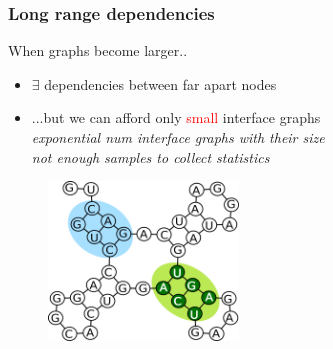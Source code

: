 \documentclass{beamer}
\newcommand{\red}[1]{\textcolor{red}{#1}}
\begin{document}
\begin{frame}
    \frametitle{Long range dependencies}
    When graphs become larger..
    \begin{itemize}
        \item $\exists$ dependencies between far apart nodes 
        \item ...but we can afford only \red{small} interface graphs  \\
        {\em exponential num interface graphs with their size} \\
        {\em not enough samples to collect statistics}
    \end{itemize}
   \begin{figure}[h!]
        \centering
        \includegraphics[width=0.45\textwidth]{images/longrangedep.png}
    \end{figure}
    
\end{frame}
\end{document}
